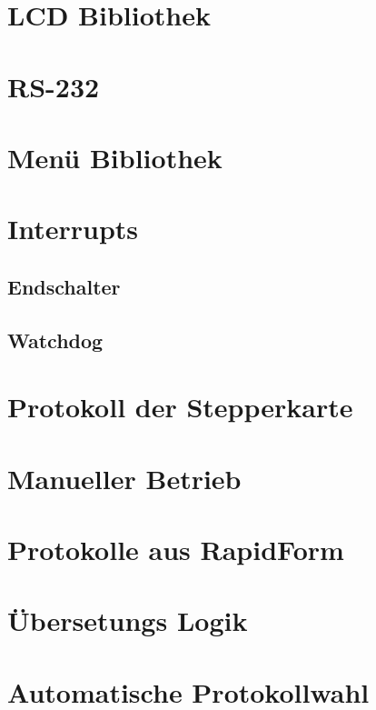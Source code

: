 \section{LCD Bibliothek}
\section{RS-232}
\section{Menü Bibliothek}
\section{Interrupts}
\subsection{Endschalter}
\subsection{Watchdog}
\section{Protokoll der Stepperkarte}
\section{Manueller Betrieb}
\section{Protokolle aus RapidForm}
\section{Übersetungs Logik}
\section{Automatische Protokollwahl}